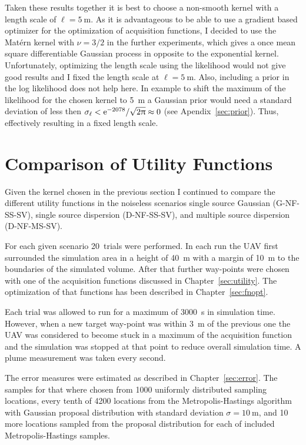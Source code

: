 Taken these results together it is best to choose a non-smooth kernel with 
a length scale of $\ell = \SI{5}{\meter}$. As it is advantageous to be able to 
use a gradient based optimizer for the optimization of acquisition functions, 
I decided to use the Matérn kernel with $\nu = 3/2$ in the further experiments, 
which gives a once mean square differentiable Gaussian process in opposite to 
the exponential kernel. Unfortunately, optimizing the length scale using the 
likelihood would not give good results and I fixed the length scale at $\ell 
= \SI{5}{\meter}$. Also, including a prior in the log likelihood does not help 
here. In example to shift the maximum of the likelihood for the chosen kernel to 
\SI{5}{\meter} a Gaussian prior would need a standard deviation of less then 
$\sigma_{\ell} < \mathrm{e}^{-2078} / \sqrt{2\uppi} \approx 0$ (see 
Apendix~\ref{sec:prior}).  Thus, effectively resulting in a fixed length scale.

\section{Comparison of Utility Functions}\label{sec:cmputility}
Given the kernel chosen in the previous section I continued to compare the 
different utility functions in the noiseless scenarios single source Gaussian 
(G-NF-SS-SV), single source dispersion (D-NF-SS-SV), and multiple source 
dispersion (D-NF-MS-SV).

For each given scenario 20~trials were performed. In each run the UAV first 
surrounded the simulation area in a height of \SI{40}{\meter} with a margin of 
\SI{10}{\meter} to the boundaries of the simulated volume. After that further 
way-points were chosen with one of the acquisition functions discussed in 
Chapter~\ref{sec:utility}. The optimization of that functions has been described 
in Chapter~\ref{sec:fnopt}.

Each trial was allowed to run for a maximum of \SI{3000}{\second} in simulation 
time. However, when a new target way-point was within \SI{3}{\meter} of the 
previous one the UAV was considered to become stuck in a maximum of the 
acquisition function and the simulation was stopped at that point to reduce 
overall simulation time. A plume measurement was taken every second.

The error measures were estimated as described in Chapter~\ref{sec:error}. The 
samples for that where chosen from 1000 uniformly distributed sampling 
locations, every tenth of 4200 locations from the Metropolis-Hastings algorithm 
with Gaussian proposal distribution with standard deviation $\sigma 
= \SI{10}{\meter}$, and 10 more locations sampled from the proposal distribution 
for each of included Metropolis-Hastings samples.

